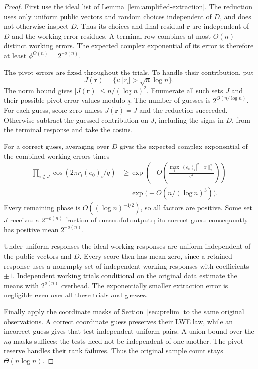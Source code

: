 \documentclass[runningheads,envcountsame,envcountsect,orivec]{llncs}
\begin{document}
\begin{proof}
First use the ideal list of
Lemma~\ref{lem:amplified-extraction}. The reduction uses
only uniform public vectors and random choices independent
of $D$, and does not otherwise inspect $D$. Thus
its choices and final residual $\boldsymbol r$ are independent
of $D$ and the working error residues. A terminal row combines at most
$O(n)$ distinct working errors. The expected complex
exponential of its error is therefore at least
$\phi^{O(n)}=2^{-o(n)}$.

The pivot errors are fixed throughout the trials. To handle
their contribution, put
\[
 J(\boldsymbol r)=\{i:|r_i|>\sqrt n\log n\}.
\]
The norm bound gives $|J(\boldsymbol r)|\le n/(\log n)^2$.
Enumerate all such sets $J$ and their possible pivot-error
values modulo $q$. The number of guesses is
$2^{O(n/\log n)}$. For each guess, score zero unless
$J(\boldsymbol r)=J$ and the reduction succeeded. Otherwise
subtract the guessed contribution on $J$, including the
signs in $D$, from the terminal response and take the cosine.

For a correct guess, averaging over $D$ gives the expected complex exponential of the combined working
errors times
\begin{align}
 \prod_{i\notin J}\cos(2\pi r_i(e_0)_i/q)
 &\ge \exp\!\left(-O\!\left(
       \frac{\max_i|(e_0)_i|^2\|\boldsymbol r\|_2^2}{q^2}
                         \right)\right)\nonumber\\
 &=\exp\bigl(-O(n/(\log n)^3)\bigr).
 \label{eq:amplified-score}
\end{align}
Every remaining phase is $O((\log n)^{-1/2})$, so all
factors are positive. Some set $J$ receives a
$2^{-o(n)}$ fraction of successful outputs; its correct
guess consequently has positive mean $2^{-o(n)}$.

Under uniform responses the ideal working responses are
uniform independent of the public vectors and $D$.
Every score then has mean zero, since a retained response
uses a nonempty set of independent working responses with
coefficients $\pm1$. Independent working trials conditional
on the original data estimate the means with $2^{o(n)}$
overhead. The exponentially smaller extraction error is
negligible even over all these trials and guesses.

Finally apply the coordinate masks of
Section~\ref{sec:prelim} to the same original observations.
A correct coordinate guess preserves their LWE law, while
an incorrect guess gives that test independent uniform pairs. A union bound over the
$nq$ masks suffices; the tests need not be independent of
one another. The pivot reserve handles their rank failures.
Thus the original sample count stays $\Theta(n\log n)$.


\end{proof}
\end{document}
